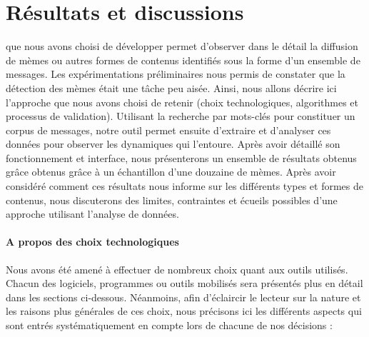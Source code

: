 \chapter{Résultats et discussions}

 que nous avons choisi de développer permet d'observer dans le détail la diffusion de mèmes ou autres formes de contenus identifiés sous la forme d'un ensemble de messages. Les expérimentations préliminaires nous permis de constater que la détection des mèmes était une tâche peu aisée. Ainsi, nous allons décrire ici l'approche que nous avons choisi de retenir (choix technologiques, algorithmes et processus de validation). Utilisant la recherche par mots-clés pour constituer un corpus de messages, notre outil permet ensuite d'extraire et d'analyser ces données pour observer les dynamiques qui l'entoure. Après avoir détaillé son fonctionnement et interface, nous présenterons un ensemble de résultats obtenus grâce obtenus grâce à un échantillon d'une douzaine de mèmes. Après avoir considéré comment ces résultats nous informe sur les différents types et formes de contenus, nous discuterons des limites, contraintes et écueils possibles d'une approche utilisant l'analyse de données.

\subsubsection{A propos des choix technologiques}

    Nous avons été amené à effectuer de nombreux choix quant aux outils utilisés. Chacun des logiciels, programmes ou outils mobilisés sera présentés plus en détail dans les sections ci-dessous. Néanmoins, afin d'éclaircir le lecteur sur la nature et les raisons plus générales de ces choix, nous précisons ici les différents aspects qui sont entrés systématiquement en compte lors de chacune de  nos décisions :

